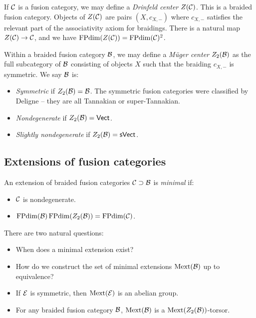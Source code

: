 \documentclass{amsart}
\begin{document}
\begin{ex}
  If $\mathcal{C}$ is a fusion category, we may define a \emph{Drinfeld center} $Z(\mathcal{C})$.
  This is a braided fusion category.
  Objects of $Z(\mathcal{C})$ are pairs $(X, c_{X,-})$ where $c_{X,-}$ satisfies the relevant part of the associativity axiom for braidings.
  There is a natural map $Z(\mathcal{C}) \to \mathcal{C}$, and we have $\operatorname{FPdim}(Z(\mathcal{C})) = \operatorname{FPdim}(\mathcal{C})^2$.
\end{ex}

Within a braided fusion category $\mathcal{B}$, we may define a \emph{M\"uger center} $Z_2(\mathcal{B})$ as the full subcategory of $\mathcal{B}$ consisting of objects $X$ such that the braiding $c_{X,-}$ is symmetric.
We say $\mathcal{B}$ is:
\begin{itemize}
  \item \emph{Symmetric} if $Z_2(\mathcal{B}) = \mathcal{B}$.
    The symmetric fusion categories were classified by Deligne -- they are all Tannakian or super-Tannakian.
  \item \emph{Nondegenerate} if $Z_2(\mathcal{B}) = \mathsf{Vect}$.
  \item \emph{Slightly nondegenerate} if $Z_2(\mathcal{B}) = \mathsf{sVect}$.
\end{itemize}

\subsection{Extensions of fusion categories}

\begin{dfn}
  An extension of braided fusion categories $\mathcal{C} \supset \mathcal{B}$ is \emph{minimal} if:
  \begin{itemize}
    \item $\mathcal{C}$ is nondegenerate.
    \item $\operatorname{FPdim}(\mathcal{B}) \operatorname{FPdim}(Z_2(\mathcal{B})) = \operatorname{FPdim}(\mathcal{C})$.
  \end{itemize}
\end{dfn}

There are two natural questions:
\begin{itemize}
  \item When does a minimal extension exist?
  \item How do we construct the set of minimal extensions $\operatorname{Mext}(\mathcal{B})$ up to equivalence?
\end{itemize}

\begin{thm}
  \begin{itemize}
    \item If $\mathcal{E}$ is symmetric, then $\operatorname{Mext}(\mathcal{E})$ is an abelian group.
    \item For any braided fusion category $\mathcal{B}$, $\operatorname{Mext}(\mathcal{B})$ is a $\operatorname{Mext}(Z_2(\mathcal{B}))$-torsor.
  \end{itemize}
\end{thm}
\end{document}
